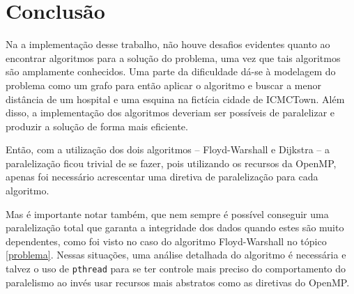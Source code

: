 \newpage
\section{Conclusão}

Na a implementação desse trabalho, não houve desafios evidentes quanto ao encontrar algoritmos para a solução do problema, uma vez que tais algoritmos são amplamente conhecidos. Uma parte da dificuldade dá-se à modelagem do problema como um grafo para então aplicar o algoritmo e buscar a menor distância de um hospital e uma esquina na fictícia cidade de ICMCTown. Além disso, a implementação dos algoritmos deveriam ser possíveis de paralelizar e produzir a solução de forma mais eficiente.

Então, com a utilização dos dois algoritmos -- Floyd-Warshall e Dijkstra -- a paralelização ficou trivial de se fazer, pois utilizando os recursos da OpenMP, apenas foi necessário acrescentar uma diretiva de paralelização para cada algoritmo.

Mas é importante notar também, que nem sempre é possível conseguir uma paralelização total que garanta a integridade dos dados quando estes são muito dependentes, como foi visto no caso do algoritmo Floyd-Warshall no tópico \ref{problema}. Nessas situações, uma análise detalhada do algoritmo é necessária e talvez o uso de \texttt{pthread} para se ter controle mais preciso do comportamento do paralelismo ao invés usar recursos mais abstratos como as diretivas do OpenMP.
